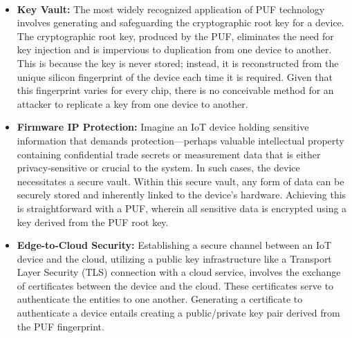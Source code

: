 \paragraph*{}
\begin{itemize}
	\item \textbf{Key Vault:} The most widely recognized application of PUF technology involves generating and safeguarding the cryptographic root key for a device. The cryptographic root key, produced by the PUF, eliminates the need for key injection and is impervious to duplication from one device to another. This is because the key is never stored; instead, it is reconstructed from the unique silicon fingerprint of the device each time it is required. Given that this fingerprint varies for every chip, there is no conceivable method for an attacker to replicate a key from one device to another.
	\item \textbf{Firmware IP Protection:} Imagine an IoT device holding sensitive information that demands protection—perhaps valuable intellectual property containing confidential trade secrets or measurement data that is either privacy-sensitive or crucial to the system. In such cases, the device necessitates a secure vault. Within this secure vault, any form of data can be securely stored and inherently linked to the device's hardware. Achieving this is straightforward with a PUF, wherein all sensitive data is encrypted using a key derived from the PUF root key.
	\item \textbf{Edge-to-Cloud Security:} Establishing a secure channel between an IoT device and the cloud, utilizing a public key infrastructure like a Transport Layer Security (TLS) connection with a cloud service, involves the exchange of certificates between the device and the cloud. These certificates serve to authenticate the entities to one another. Generating a certificate to authenticate a device entails creating a public/private key pair derived from the PUF fingerprint.
\end{itemize}




